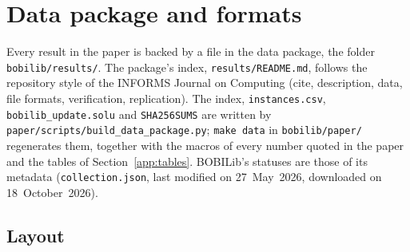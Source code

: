\section{Data package and formats}\label{app:data}

Every result in the paper is backed by a file in the data package, the
folder \texttt{bobilib/results/}. The package's index,
\texttt{results/README.md}, follows the repository style of the INFORMS
Journal on Computing (cite, description, data, file formats, verification,
replication). The index, \texttt{instances.csv},
\texttt{bobilib\_update.solu} and \texttt{SHA256SUMS} are written by
\texttt{paper/scripts/build\_data\_package.py}; \texttt{make data} in
\texttt{bobilib/paper/} regenerates them, together with the macros of every
number quoted in the paper and the tables of Section~\ref{app:tables}. BOBILib's
statuses are those of its metadata (\texttt{collection.json}, last modified on
27~May~2026, downloaded on 18~October~2026).

\subsection{Layout}

